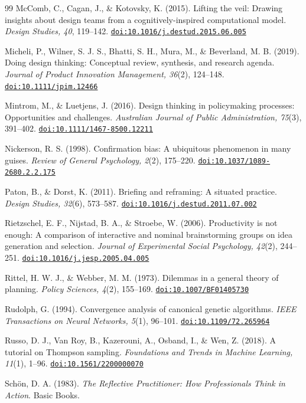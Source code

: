\documentclass[preprint,review,11pt,authoryear]{elsarticle}
\providecommand{\doi}[1]{\href{https://doi.org/#1}{\nolinkurl{doi:#1}}}
\theoremstyle{definition}
\begin{document}
\begin{thebibliography}{99}
 McComb, C., Cagan, J., \& Kotovsky, K. (2015). Lifting the veil: Drawing insights about design teams from a cognitively-inspired computational model. \textit{Design Studies, 40}, 119--142. \doi{10.1016/j.destud.2015.06.005}

 Micheli, P., Wilner, S. J. S., Bhatti, S. H., Mura, M., \& Beverland, M. B. (2019). Doing design thinking: Conceptual review, synthesis, and research agenda. \textit{Journal of Product Innovation Management, 36}(2), 124--148. \doi{10.1111/jpim.12466}

 Mintrom, M., \& Luetjens, J. (2016). Design thinking in policymaking processes: Opportunities and challenges. \textit{Australian Journal of Public Administration, 75}(3), 391--402. \doi{10.1111/1467-8500.12211}

 Nickerson, R. S. (1998). Confirmation bias: A ubiquitous phenomenon in many guises. \textit{Review of General Psychology, 2}(2), 175--220. \doi{10.1037/1089-2680.2.2.175}

 Paton, B., \& Dorst, K. (2011). Briefing and reframing: A situated practice. \textit{Design Studies, 32}(6), 573--587. \doi{10.1016/j.destud.2011.07.002}

 Rietzschel, E. F., Nijstad, B. A., \& Stroebe, W. (2006). Productivity is not enough: A comparison of interactive and nominal brainstorming groups on idea generation and selection. \textit{Journal of Experimental Social Psychology, 42}(2), 244--251. \doi{10.1016/j.jesp.2005.04.005}

 Rittel, H. W. J., \& Webber, M. M. (1973). Dilemmas in a general theory of planning. \textit{Policy Sciences, 4}(2), 155--169. \doi{10.1007/BF01405730}

 Rudolph, G. (1994). Convergence analysis of canonical genetic algorithms. \textit{IEEE Transactions on Neural Networks, 5}(1), 96--101. \doi{10.1109/72.265964}

 Russo, D. J., Van Roy, B., Kazerouni, A., Osband, I., \& Wen, Z. (2018). A tutorial on Thompson sampling. \textit{Foundations and Trends in Machine Learning, 11}(1), 1--96. \doi{10.1561/2200000070}

 Sch{\"o}n, D. A. (1983). \textit{The Reflective Practitioner: How Professionals Think in Action}. Basic Books.


\end{thebibliography}
\end{document}
